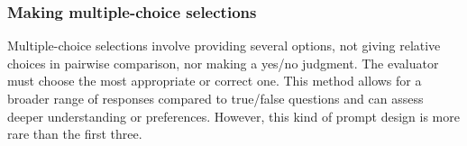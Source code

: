 \documentclass[acmsmall,screen]{acmart}
\begin{document}
    
    
    
    





\subsubsection{\textbf{Making multiple-choice selections}}
Multiple-choice selections involve providing several options, not giving relative choices in pairwise comparison, nor making a yes/no judgment.
The evaluator must choose the most appropriate or correct one. This method allows for a broader range of responses compared to true/false questions and can assess deeper understanding or preferences. However, this kind of prompt design is more rare than the first three.


    
\end{document}
